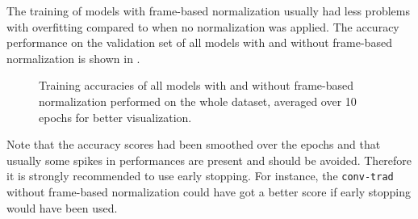 \FloatBarrier
\noindent
The training of models with frame-based normalization usually had less problems with overfitting compared to when no normalization was applied.
The accuracy performance on the validation set of all models with and without frame-based normalization is shown in .
\begin{figure}[!ht]
  \centering
  \caption{Training accuracies of all models with and without frame-based normalization performed on the whole dataset, averaged over 10 epochs for better visualization.}
  \label{fig:exp_final_acc}
\end{figure}
\FloatBarrier
\noindent
Note that the accuracy scores had been smoothed over the epochs and that usually some spikes in performances are present and should be avoided.
Therefore it is strongly recommended to use early stopping.
For instance, the \texttt{conv-trad} without frame-based normalization could have got a better score if early stopping would have been used.

